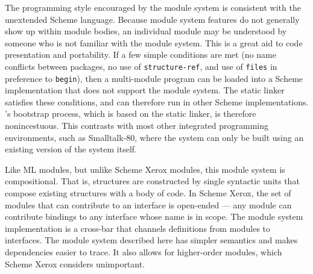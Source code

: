 The programming style encouraged by the module system is consistent
with the unextended Scheme language.  Because module system features
do not generally show up within module bodies, an individual module
may be understood by someone who is not familiar with the module
system.  This is a great aid to code presentation and portability.  If
a few simple conditions are met (no name conflicts between packages,
no use of {\tt structure-ref}, and use of {\tt files} in preference to
{\tt begin}), then a multi-module program can be loaded into a Scheme
implementation that does not support the module system.  The \hack{}
static linker satisfies these conditions, and can therefore run in
other Scheme implementations.  \hack{}'s bootstrap process, which is
based on the static linker, is therefore nonincestuous.  This
contrasts with most other integrated programming environments, such as
Smalltalk-80, where the system can only be built using an existing
version of the system itself.

Like ML modules, but unlike Scheme Xerox modules, this module system
is compositional.  That is, structures are constructed by single
syntactic units that compose existing structures with a body of code.
In Scheme Xerox, the set of modules that can contribute to an
interface is open-ended --- any module can contribute bindings to any
interface whose name is in scope.  The module system implementation is
a cross-bar that channels definitions from modules to interfaces.  The
module system described here has simpler semantics and makes
dependencies easier to trace.  It also allows for higher-order
modules, which Scheme Xerox considers unimportant.

%
%

